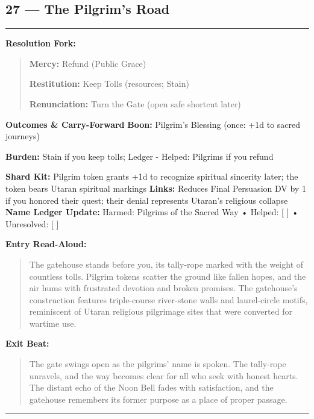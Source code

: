 \documentclass[18pt, letterpaper, twoside]{article}
\newenvironment{floorbox}[1]{%
    \begin{center}
    \begin{minipage}{0.95\textwidth}
    \subsection*{#1}
    \vspace{-0.5em}
    \rule{\textwidth}{0.5pt}
    \vspace{0.5em}
}{%
    \vspace{0.5em}
    \rule{\textwidth}{0.5pt}
    \end{minipage}
    \end{center}
}
\newenvironment{resolutionbox}{%
    \vspace{0.5em}
    \noindent\textbf{Resolution Fork:}
    \begin{quote}
}{%
    \end{quote}
    \vspace{0.5em}
}
\newenvironment{boxedtext}[1]{%
    \vspace{0.5em}
    \noindent\textbf{#1}
    \begin{quote}
}{%
    \end{quote}
    \vspace{0.5em}
}
\newcommand{\boon}[1]{\noindent\textbf{Boon:} #1\par}
\newcommand{\burden}[1]{\noindent\textbf{Burden:} #1\par}
\newcommand{\entrytext}[1]{\begin{boxedtext}{Entry Read-Aloud:} #1 \end{boxedtext}}
\newcommand{\exittext}[1]{\begin{boxedtext}{Exit Beat:} #1 \end{boxedtext}}
\begin{document}
\begin{floorbox}{27 --- The Pilgrim's Road}
\begin{resolutionbox}
\textbf{Mercy:} Refund (Public Grace)

\textbf{Restitution:} Keep Tolls (resources; Stain)

\textbf{Renunciation:} Turn the Gate (open safe shortcut later)
\end{resolutionbox}

\textbf{Outcomes \& Carry-Forward}
\boon{Pilgrim's Blessing (once: +1d to sacred journeys)}
\burden{Stain if you keep tolls; Ledger - Helped: Pilgrims if you refund}
\textbf{Shard Kit:} Pilgrim token grants +1d to recognize spiritual sincerity later; the token bears Utaran spiritual markings
\textbf{Links:} Reduces Final Persuasion DV by 1 if you honored their quest; their denial represents Utaran's religious collapse
\textbf{Name Ledger Update:} Harmed: Pilgrims of the Sacred Way • Helped: [ ] • Unresolved: [ ]

\entrytext{The gatehouse stands before you, its tally-rope marked with the weight of countless tolls. Pilgrim tokens scatter the ground like fallen hopes, and the air hums with frustrated devotion and broken promises. The gatehouse's construction features triple-course river-stone walls and laurel-circle motifs, reminiscent of Utaran religious pilgrimage sites that were converted for wartime use.}

\exittext{The gate swings open as the pilgrims' name is spoken. The tally-rope unravels, and the way becomes clear for all who seek with honest hearts. The distant echo of the Noon Bell fades with satisfaction, and the gatehouse remembers its former purpose as a place of proper passage.}
\end{floorbox}
\end{document}
